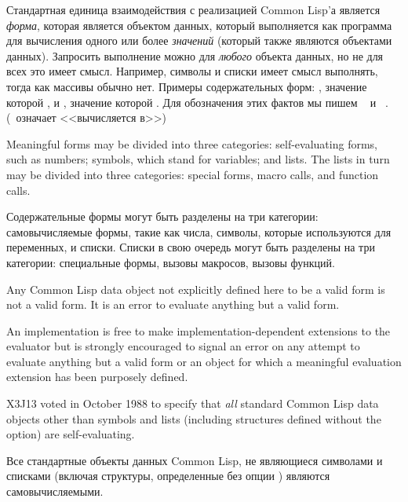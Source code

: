 Стандартная единица взаимодействия с реализацией Common Lisp'а является
\textit{форма}, которая является объектом данных, который выполняется как
программа для вычисления одного или более \textit{значений} (который также
являются объектами данных). Запросить выполнение можно для \textit{любого}
объекта данных, но не для всех это имеет смысл. Например, символы и списки имеет
смысл выполнять, тогда как массивы обычно нет. Примеры содержательных форм:
, значение которой , и , значение которой .
Для обозначения этих фактов мы пишем  \EV\  и  \EV\
. (\EV\ означает <<вычисляется в>>)

Meaningful forms may be divided into three categories:
self-evaluating forms, such as numbers; symbols, which stand
for variables; and lists.  The lists in turn may be divided
into three categories: special forms, macro calls, and function calls.

Содержательные формы могут быть разделены на три категории:
самовычисляемые формы, такие как числа,
символы, которые используются для переменных,
и списки. Списки в свою очередь могут быть разделены на три категории:
специальные формы, 
вызовы макросов,
вызовы функций.

\begin{obsolete}
Any Common Lisp data object not explicitly defined here to be a valid form
is not a valid form.  It is an error to evaluate
anything but a valid form.

\beforenoterule
\begin{implementation}
An implementation is free to make
implementation-dependent extensions to the evaluator but is
strongly encouraged to signal an error on any attempt to
evaluate anything but a valid form or an object for which
a meaningful evaluation extension has been purposely defined.
\end{implementation}
\afternoterule
\end{obsolete}

\begin{newer}
X3J13 voted in October 1988  to specify that
\textit{all} standard Common Lisp data objects other than symbols
and lists (including \cdf{defstruct} structures defined
without the  option) are self-evaluating.

Все стандартные объекты данных Common Lisp, не являющиеся символами и списками
(включая \cdf{defstruct} структуры, определенные без опции \cd{:type}) являются
самовычисляемыми. 
\end{newer}

